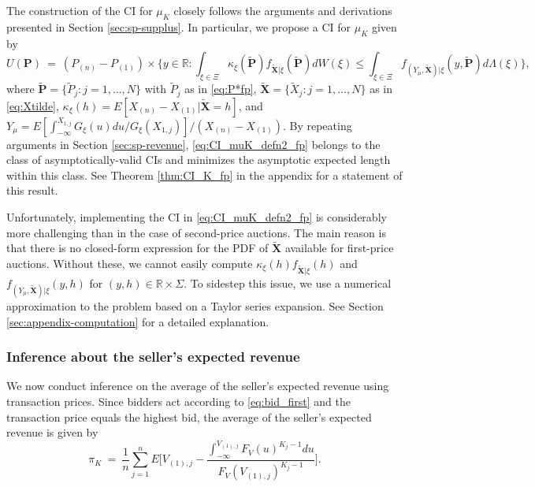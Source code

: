The construction of the CI for $\mu _{K}$ closely follows the arguments and derivations presented in Section \ref{sec:sp-supplus}. In particular, we propose a CI for $\mu _{K}$ given by
\begin{equation}
U(\mathbf{P})~=~(P_{(n)}-P_{(1)})\times \bigg\{y\in \mathbb{R}:\int_{\xi \in \Xi }\kappa _{\xi} (\mathbf{\tilde{P}})f_{\tilde{\mathbf{X}}|\xi }(\mathbf{ \tilde{P}})dW(\xi )\leq \int_{\xi \in \Xi }f_{(Y_{\mu},\tilde{\mathbf{X}})|\xi }(y,\mathbf{\tilde{P}})d\Lambda (\xi )\bigg\},  \label{eq:CI_muK_defn2_fp}
\end{equation}
where $\mathbf{\tilde{P}}=\{\tilde{P}_{j}:j=1,\dots ,N\}$ with $\tilde{P}_{j}$ as in \eqref{eq:P*fp}, $\mathbf{\tilde{X}}=\{\tilde{X}_{j}:j=1,\dots ,N\}$ as in \eqref{eq:Xtilde}, $\kappa _{\xi }(h)=E[ X_{( n) }-X_{( 1) }|\mathbf{\tilde{X}}=h] $, and $Y_{\mu }=E[ \int\nolimits_{-\infty }^{X_{1,j}}{G}_{\xi }{(u)}du/G_{\xi }( X_{1,j}) ]/(X_{( n) }-X_{( 1) }) $. By repeating arguments in Section \ref{sec:sp-revenue}, \eqref{eq:CI_muK_defn2_fp} belongs to the class of asymptotically-valid CIs and minimizes the asymptotic expected length within this class. See Theorem \ref{thm:CI_K_fp} in the appendix for a statement of this result.

Unfortunately, implementing the CI in \eqref{eq:CI_muK_defn2_fp} is considerably more challenging than in the case of second-price auctions. The main reason is that there is no closed-form expression for the PDF of $\mathbf{\tilde{X}}$ available for first-price auctions. 
Without these, we cannot easily compute $\kappa _{\xi} (h)f_{\tilde{\mathbf{X}}|\xi }(h)$ and $f_{(Y_{\mu},\tilde{\mathbf{X}})|\xi }(y,h)$ for $(y,h) \in \mathbb{R} \times \Sigma$. To sidestep this issue, we use a numerical approximation to the problem based on a Taylor series expansion. See Section \ref{sec:appendix-computation} for a detailed explanation.

\subsubsection{Inference about the seller's expected revenue}

We now conduct inference on the average of the seller's expected revenue using transaction prices. Since bidders act according to \eqref{eq:bid_first} and the transaction price equals the highest bid, the average of the seller's expected revenue is given by
\begin{equation}
\pi _{K}~= 
~\frac{1}{n}\sum_{j=1}^{n}E\Big[V_{(1),j}-\frac{\int_{-\infty }^{V_{(1),j}}{F_{V}(u)^{K_{j}-1}}du}{F_{V}(V_{(1),j})^{K_{j}-1}}\Big].  \label{eq:seller2}
\end{equation}

